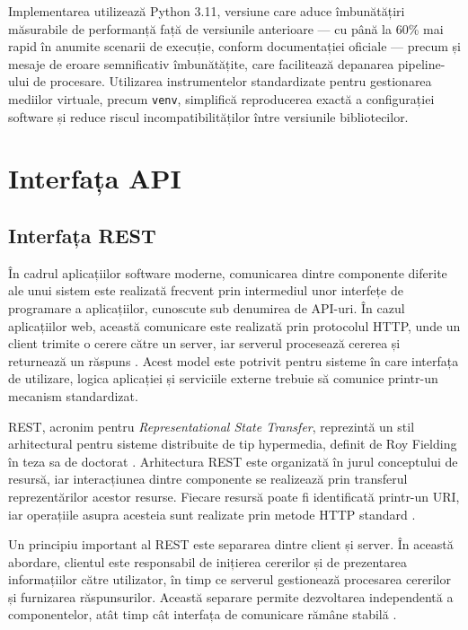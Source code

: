 \documentclass[12pt, a4paper, oneside, romanian]{teza-upb}
\begin{document}
Implementarea utilizează Python 3.11, versiune care aduce îmbunătățiri măsurabile
de performanță față de versiunile anterioare — cu până la 60\% mai rapid în anumite
scenarii de execuție, conform documentației oficiale \cite{python311} — precum și
mesaje de eroare semnificativ îmbunătățite, care facilitează depanarea pipeline-ului
de procesare. Utilizarea instrumentelor standardizate pentru gestionarea mediilor
virtuale, precum \texttt{venv}, simplifică reproducerea exactă
a configurației software și reduce riscul incompatibilităților între versiunile
bibliotecilor.



\section{Interfața API}


\subsection{Interfața REST}

În cadrul aplicațiilor software moderne, comunicarea dintre componente diferite ale unui sistem este realizată frecvent prin intermediul unor interfețe de programare a aplicațiilor, cunoscute sub denumirea de API-uri. În cazul aplicațiilor web, această comunicare este realizată prin protocolul HTTP, unde un client trimite o cerere către un server, iar serverul procesează cererea și returnează un răspuns \cite{mdn_client_server}. Acest model este potrivit pentru sisteme în care interfața de utilizare, logica aplicației și serviciile externe trebuie să comunice printr-un mecanism standardizat.

REST, acronim pentru \textit{Representational State Transfer}, reprezintă un stil arhitectural pentru sisteme distribuite de tip hypermedia, definit de Roy Fielding în teza sa de doctorat \cite{fielding_rest}. Arhitectura REST este organizată în jurul conceptului de resursă, iar interacțiunea dintre componente se realizează prin transferul reprezentărilor acestor resurse. Fiecare resursă poate fi identificată printr-un URI, iar operațiile asupra acesteia sunt realizate prin metode HTTP standard \cite{fielding_rest,mdn_rest}.

Un principiu important al REST este separarea dintre client și server. În această abordare, clientul este responsabil de inițierea cererilor și de prezentarea informațiilor către utilizator, în timp ce serverul gestionează procesarea cererilor și furnizarea răspunsurilor. Această separare permite dezvoltarea independentă a componentelor, atât timp cât interfața de comunicare rămâne stabilă \cite{fielding_rest}.
\end{document}
